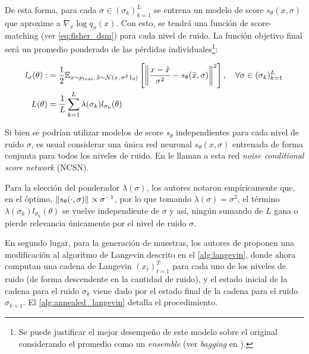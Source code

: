 De esta forma, para cada $\sigma\in(\sigma_k)_{k=1}^L$ se entrena un modelo de score $s_\theta(x,\sigma)$ que aproxime a $\nabla_x \log q_\sigma(x)$. Con esto, se tendrá una función de score-matching (ver \eqref{eq:fisher_dsm}) para cada nivel de ruido. La función objetivo final será un promedio ponderado de las pérdidas individuales\footnote{Se puede justificar el mejor desempeño de este modelo sobre el original considerando el promedio como un \textit{ensemble} (ver \textit{bagging} en \cite{bishop2006pattern}).}:

\begin{align}
    l_\sigma(\theta) : & = \frac{1}{2}\mathbb{E}_{x\sim p_{\operatorname{true}},\,\tilde{x}\sim \mathcal{N}\left(x,\,\sigma^2 \operatorname{I}_{d}\right)}\left[\left\lVert \frac{x-\tilde{x}}{\sigma^2} - s_\theta(\tilde{x}, \sigma) \right\rVert^2\right],\quad \forall\sigma\in (\sigma_k)_{k=1}^L\nonumber \\
    L(\theta)          & = \frac{1}{L} \sum_{k=1}^L \lambda(\sigma_k) l_{\sigma_k}(\theta)\label{eq:dsm_loss}
\end{align}

Si bien se podrían utilizar modelos de score $s_\theta$ independientes para cada nivel de ruido $\sigma$, es usual considerar una única red neuronal $s_\theta(x,\sigma)$ entrenada de forma conjunta para todos los niveles de ruido. En \cite{song2020generative} le llaman a esta red \textit{noise conditional score network} (NCSN).

Para la elección del ponderador $\lambda(\sigma)$, los autores notaron empíricamente que, en el óptimo, $\left\lVert s_\theta(\cdot, \sigma) \right\rVert\propto \sigma^{-1}$, por lo que tomando $\lambda(\sigma) = \sigma^2$, el término $\lambda(\sigma_k) l_{\sigma_k}(\theta)$ se vuelve independiente de $\sigma$ y así, ningún sumando de $L$ gana o pierde relevancia únicamente por el nivel de ruido $\sigma$.

En segundo lugar, para la generación de muestras, los autores de \cite{song2020generative} proponen una modificación al algoritmo de Langevin descrito en el \autoref{alg:langevin}, donde ahora computan una cadena de Langevin $(x_t)_{t=1}^T$ para cada uno de los niveles de ruido (de forma descendente en la cantidad de ruido), y el estado inicial de la cadena para el ruido $\sigma_k$ viene dado por el estado final de la cadena para el ruido $\sigma_{k+1}$. El \autoref{alg:annealed_langevin} detalla el procedimiento.

